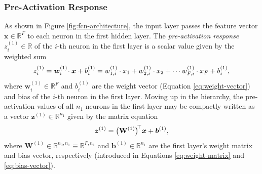 \documentclass[11pt, a4paper]{article}
\renewcommand{\vec}[1]{\bm{#1}}
\newcommand{\mat}[1]{\mathbf{#1}}
\newcommand{\W}{\mat{W}}
\newcommand{\x}{\vec{x}}
\newcommand{\w}{\vec{w}}
\renewcommand{\b}{\vec{b}}
\newcommand{\z}{\vec{z}}
\begin{document}
\subsubsection{Pre-Activation Response}
As shown in Figure \ref{fig:fcn-architecture}, the input layer passes the feature vector $ \x \in \mathbb{R}^{F} $ to each neuron in the first hidden layer.
The \textit{pre-activation response} $ z_{i}^{(1)} \in \mathbb{R} $ of the $ i $-th neuron in the first layer is a scalar value given by the weighted sum
\begin{equation*}
    z_{i}^{(1)} = \w_{i}^{(1)} \mspace{-3mu} \cdot \x + b_{i}^{(1)}= w_{1, i}^{(1)} \cdot x_{1} + w_{2, i}^{(1)} \cdot x_{2} + \cdots w_{F, i}^{(1)} \cdot x_{F} + b_{i}^{(1)},
\end{equation*}
where $ \w_{i}^{(1)} \in \mathbb{R}^{F} $ and $ b_{i}^{(1)} $ are the weight vector (Equation \ref{eq:weight-vector}) and bias of the $ i $-th neuron in the first layer.
Moving up in the hierarchy, the pre-activation values of all $ n_{1} $ neurons in the first layer may be compactly written as a vector $ \z^{(1)} \in \mathbb{R}^{n_{1}} $ given by the matrix equation
\begin{equation*}
    \z^{(1)} = \big( \W^{(1)} \big)^{\mspace{-4mu}\top}\x + \b^{(1)},
\end{equation*}
where $ \W^{(1)} \in \mathbb{R}^{n_{0}, n_{1}} \equiv \mathbb{R}^{F, n_{1}} $ and $ \b^{(1)} \in \mathbb{R}^{n_{1}} $ are the first layer's weight matrix and bias vector, respectively (introduced in Equations \ref{eq:weight-matrix} and \ref{eq:bias-vector}).
\end{document}

